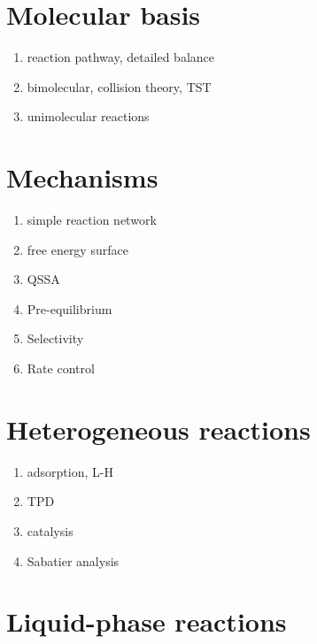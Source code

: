 \documentclass[11pt]{article}
\begin{document}
\section{Molecular basis}
\label{sec:org849e6ea}
\begin{enumerate}
\item reaction pathway, detailed balance
\item bimolecular, collision theory, TST
\item unimolecular reactions
\end{enumerate}

\section{Mechanisms}
\label{sec:org9fa1c65}
\begin{enumerate}
\item simple reaction network
\item free energy surface
\item QSSA
\item Pre-equilibrium
\item Selectivity
\item Rate control
\end{enumerate}

\section{Heterogeneous reactions}
\label{sec:org3ae5bb4}
\begin{enumerate}
\item adsorption, L-H
\item TPD
\item catalysis
\item Sabatier analysis
\end{enumerate}

\section{Liquid-phase reactions}
\label{sec:orga84d53c}
\end{document}
